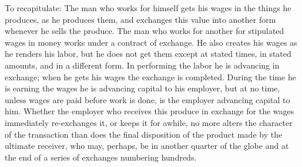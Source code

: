 To recapitulate: The man who works for himself gets his wages in the
things he produces, as he produces them, and exchanges this value into
another form whenever he sells the produce. The man who works for
another for stipulated wages in money works under a contract of
exchange. He also creates his wages as he renders his labor, but he does
not get them except at stated times, in stated amounts, and in a
different form. In performing the labor he is advancing in exchange;
when he gets his wages the exchange is completed. During the time he is
earning the wages he is advancing capital to his employer, but at no
time, unless wages are paid before work is done, is the employer
advancing capital to him. Whether the employer who receives this produce
in exchange for the wages immediately re-exchanges it, or keeps it for
awhile, no more alters the character of the transaction than does the
final disposition of the product made by the ultimate receiver, who may,
perhaps, be in another quarter of the globe and at the end of a series
of exchanges numbering hundreds.

\newpage
